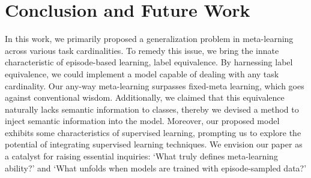 \documentclass[letterpaper]{article} %
\begin{document}
\section{Conclusion and Future Work}
In this work, we primarily proposed a generalization problem in meta-learning across various task cardinalities. To remedy this issue, we  bring the innate characteristic of episode-based learning, label equivalence. By harnessing label equivalence, we could implement a model capable of dealing with any task cardinality. Our any-way meta-learning surpasses fixed-meta learning, which goes against conventional wisdom. Additionally, we claimed that this equivalence naturally lacks semantic information to classes, thereby we devised a method to inject semantic information into the model. Moreover, our proposed model exhibits some characteristics of supervised learning, prompting us to explore the potential of integrating supervised learning techniques. %
We envision our paper as a catalyst for raising essential inquiries: `What truly defines meta-learning ability?' and `What unfolds when models are trained with episode-sampled data?'
\end{document}
